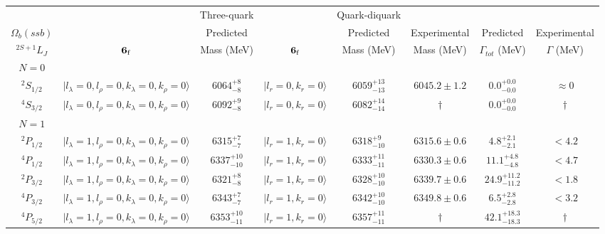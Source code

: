 \begin{tabular}{c| c c c c c c c}\hline \hline
        &    & Three-quark & & Quark-diquark    &               &              &  \\ 
$\Omega_{b}(ssb)$ & & Predicted   &  &  Predicted   &  Experimental &  Predicted            & Experimental \\ 
 $^{2S+1}L_{J}$  &${\bf {6}}_{\rm f}$&  Mass (MeV)  & ${\bf {6}}_{\rm f}$&  Mass (MeV)   &  Mass (MeV)   &  $\Gamma_{tot}$ (MeV) & $\Gamma$ (MeV) \\ \hline
\hline
 $N=0$  &  &  &  &  &  \\ 
$^{2}S_{1/2}$ & $\vert l_{\lambda}\!\!=\!0, l_{\rho}\!\!=\!0, k_{\lambda}\!\!=\!0, k_{\rho}\!\!=\!0 \rangle$ & $6064^{+8}_{-8}$ & $\vert l_r\!\!=\!0, k_r\!\!=\!0 \rangle$ & $6059^{+13}_{-13}$ & $6045.2\pm 1.2$ & $0.0^{+0.0}_{-0.0}$ & $\approx 0$ \\ 
$^{4}S_{3/2}$ & $\vert l_{\lambda}\!\!=\!0, l_{\rho}\!\!=\!0, k_{\lambda}\!\!=\!0, k_{\rho}\!\!=\!0 \rangle$ & $6092^{+9}_{-8}$ & $\vert l_r\!\!=\!0, k_r\!\!=\!0 \rangle$ & $6082^{+14}_{-14}$ & $\dagger$ & $0.0^{+0.0}_{-0.0}$ & $\dagger$ \\ 
\hline
 $N=1$  &  &  &  &  &  \\ 
$^{2}P_{1/2}$ & $\vert l_{\lambda}\!\!=\!1, l_{\rho}\!\!=\!0, k_{\lambda}\!\!=\!0, k_{\rho}\!\!=\!0 \rangle$ & $6315^{+7}_{-7}$ & $\vert l_r\!\!=\!1, k_r\!\!=\!0 \rangle$ & $6318^{+9}_{-10}$ & $6315.6\pm 0.6$ & $4.8^{+2.1}_{-2.1}$ & $<4.2$ \\ 
$^{4}P_{1/2}$ & $\vert l_{\lambda}\!\!=\!1, l_{\rho}\!\!=\!0, k_{\lambda}\!\!=\!0, k_{\rho}\!\!=\!0 \rangle$ & $6337^{+10}_{-10}$ & $\vert l_r\!\!=\!1, k_r\!\!=\!0 \rangle$ & $6333^{+11}_{-11}$ & $6330.3\pm 0.6$ & $11.1^{+4.8}_{-4.8}$ & $<4.7$ \\ 
$^{2}P_{3/2}$ & $\vert l_{\lambda}\!\!=\!1, l_{\rho}\!\!=\!0, k_{\lambda}\!\!=\!0, k_{\rho}\!\!=\!0 \rangle$ & $6321^{+8}_{-8}$ & $\vert l_r\!\!=\!1, k_r\!\!=\!0 \rangle$ & $6328^{+10}_{-10}$ & $6339.7\pm 0.6$ & $24.9^{+11.2}_{-11.2}$ & $<1.8$ \\ 
$^{4}P_{3/2}$ & $\vert l_{\lambda}\!\!=\!1, l_{\rho}\!\!=\!0, k_{\lambda}\!\!=\!0, k_{\rho}\!\!=\!0 \rangle$ & $6343^{+7}_{-7}$ & $\vert l_r\!\!=\!1, k_r\!\!=\!0 \rangle$ & $6342^{+10}_{-10}$ & $6349.8\pm 0.6$ & $6.5^{+2.8}_{-2.8}$ & $<3.2$ \\ 
$^{4}P_{5/2}$ & $\vert l_{\lambda}\!\!=\!1, l_{\rho}\!\!=\!0, k_{\lambda}\!\!=\!0, k_{\rho}\!\!=\!0 \rangle$ & $6353^{+10}_{-11}$ & $\vert l_r\!\!=\!1, k_r\!\!=\!0 \rangle$ & $6357^{+11}_{-11}$ & $\dagger$ & $42.1^{+18.3}_{-18.3}$ & $\dagger$ \\ 

\end{tabular}
